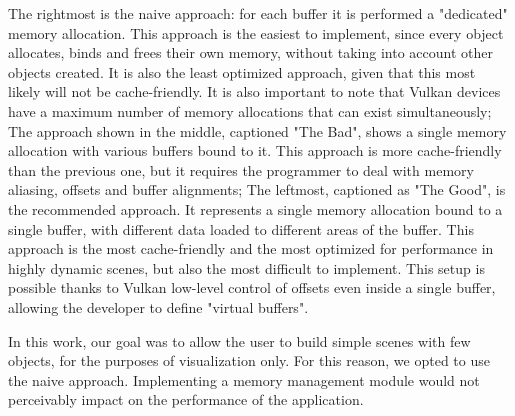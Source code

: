 The rightmost is the naive approach: for each buffer it is performed a "dedicated" memory allocation. This approach is the easiest to implement, since every object allocates, binds and frees their own memory, without taking into account other objects created. It is also the least optimized approach, given that this most likely will not be cache-friendly. It is also important to note that Vulkan devices have a maximum number of memory allocations that can exist simultaneously;
The approach shown in the middle, captioned "The Bad", shows a single memory allocation with various buffers bound to it. This approach is more cache-friendly than the previous one, but it requires the programmer to deal with memory aliasing, offsets and buffer alignments;
The leftmost, captioned as "The Good", is the recommended approach. It represents a single memory allocation bound to a single buffer, with different data loaded to different areas of the buffer. This approach is the most cache-friendly and the most optimized for performance in highly dynamic scenes, but also the most difficult to implement. This setup is possible thanks to Vulkan low-level control of offsets even inside a single buffer, allowing the developer to define "virtual buffers".

In this work, our goal was to allow the user to build simple scenes with few objects, for the purposes of visualization only. For this reason, we opted to use the naive approach. Implementing a memory management module would not perceivably impact on the performance of the application.
